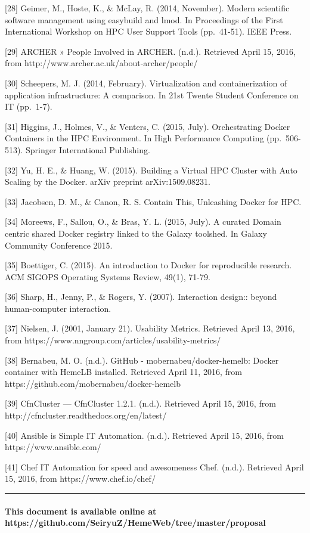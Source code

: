 \documentclass[]{article}
\let\oldparagraph\paragraph
\renewcommand{\paragraph}[1]{\oldparagraph{#1}\mbox{}}
\begin{document}
{[}28{]} Geimer, M., Hoste, K., \& McLay, R. (2014, November). Modern
scientific software management using easybuild and lmod. In Proceedings
of the First International Workshop on HPC User Support Tools
(pp.~41-51). IEEE Press.

{[}29{]} ARCHER » People Involved in ARCHER. (n.d.). Retrieved April 15,
2016, from http://www.archer.ac.uk/about-archer/people/

{[}30{]} Scheepers, M. J. (2014, February). Virtualization and
containerization of application infrastructure: A comparison. In 21st
Twente Student Conference on IT (pp.~1-7).

{[}31{]} Higgins, J., Holmes, V., \& Venters, C. (2015, July).
Orchestrating Docker Containers in the HPC Environment. In High
Performance Computing (pp.~506-513). Springer International Publishing.

{[}32{]} Yu, H. E., \& Huang, W. (2015). Building a Virtual HPC Cluster
with Auto Scaling by the Docker. arXiv preprint arXiv:1509.08231.

{[}33{]} Jacobsen, D. M., \& Canon, R. S. Contain This, Unleashing
Docker for HPC.

{[}34{]} Moreews, F., Sallou, O., \& Bras, Y. L. (2015, July). A curated
Domain centric shared Docker registry linked to the Galaxy toolshed. In
Galaxy Community Conference 2015.

{[}35{]} Boettiger, C. (2015). An introduction to Docker for
reproducible research. ACM SIGOPS Operating Systems Review, 49(1),
71-79.

{[}36{]} Sharp, H., Jenny, P., \& Rogers, Y. (2007). Interaction
design:: beyond human-computer interaction.

{[}37{]} Nielsen, J. (2001, January 21). Usability Metrics. Retrieved
April 13, 2016, from https://www.nngroup.com/articles/usability-metrics/

{[}38{]} Bernabeu, M. O. (n.d.). GitHub - mobernabeu/docker-hemelb:
Docker container with HemeLB installed. Retrieved April 11, 2016, from
https://github.com/mobernabeu/docker-hemelb

{[}39{]} CfnCluster --- CfnCluster 1.2.1. (n.d.). Retrieved April 15,
2016, from http://cfncluster.readthedocs.org/en/latest/

{[}40{]} Ansible is Simple IT Automation. (n.d.). Retrieved April 15,
2016, from https://www.ansible.com/

{[}41{]} Chef \textbar{} IT Automation for speed and awesomeness
\textbar{} Chef. (n.d.). Retrieved April 15, 2016, from
https://www.chef.io/chef/

\begin{center}\rule{0.5\linewidth}{\linethickness}\end{center}

\paragraph{This document is available online at
https://github.com/SeiryuZ/HemeWeb/tree/master/proposal}\label{this-document-is-available-online-at-httpsgithub.comseiryuzhemewebtreemasterproposal}
\end{document}
